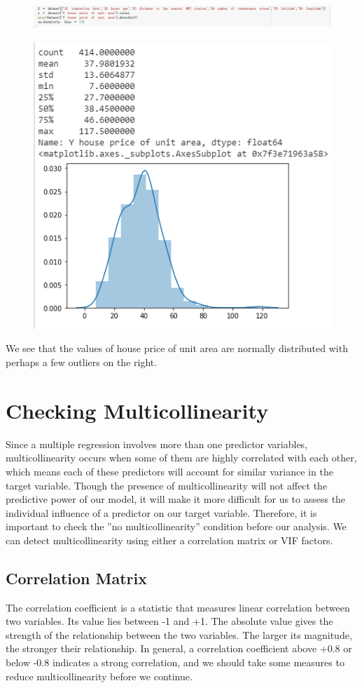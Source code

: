 \documentclass{article}
\begin{document}
\begin{figure}[H]\includegraphics[width=1.1\linewidth]{6}\end{figure}
\begin{figure}[H]\centering\includegraphics[width=0.5\linewidth]{7}\end{figure}
We see that the values of house price of unit area are normally distributed with perhaps a few outliers on the right.
\section*{Checking Multicollinearity}
Since a multiple regression involves more than one predictor variables, multicollinearity occurs when some of them are highly correlated with each other, which means each of these predictors will account for similar variance in the target variable. Though the presence of multicollinearity will not affect the predictive power of our model, it will make it more difficult for us to assess the individual influence of a predictor on our target variable. Therefore, it is important to check the ”no multicollinearity” condition before our analysis. We can detect multicollinearity using either a correlation matrix or VIF factors.
\subsection*{Correlation Matrix}
The correlation coefficient is a statistic that measures linear correlation between two variables. Its value lies between -1 and +1. The absolute value gives the strength of the relationship between the two variables. The larger its magnitude, the stronger their relationship. In general, a correlation coefficient above +0.8 or below -0.8 indicates a strong correlation, and we should take some measures to reduce multicollinearity before we continue.
\end{document}
